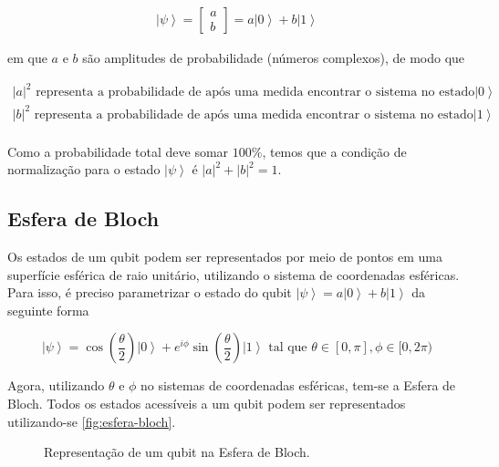 \[\begin{aligned}
\left | \psi \right \rangle = \begin{bmatrix} a \\ b \end{bmatrix} = a \left| 0 \right \rangle + b \left| 1 \right \rangle
\end{aligned}\]

em que \(a\) e \(b\) são {amplitudes de probabilidade} (números
complexos), de modo que

\begin{gather*}
    |a|^2 \text{ representa a probabilidade de após uma medida encontrar o sistema no estado}
\left| 0 \right\rangle\\
    |b|^2 \text{ representa a probabilidade de após uma medida encontrar o sistema no estado}
\left| 1 \right\rangle\\
\end{gather*}

Como a probabilidade total deve somar \(100\%\), temos que a {condição
de normalização} para o estado \(\left| \psi \right\rangle\) é
\(|a|^2 + |b|^2 = 1\).

\subsection{Esfera de Bloch}\label{subsec:esfera-de-bloch}

Os estados de um qubit podem ser representados por meio de pontos em uma
superfície esférica de raio unitário, utilizando o sistema de
coordenadas esféricas.
Para isso, é preciso parametrizar o estado do qubit
\(\left| \psi \right\rangle = a \left| 0 \right\rangle + b \left| 1 \right\rangle\)
da seguinte forma

\[\left| \psi \right\rangle = \cos\left(  \dfrac{\theta}{2} \right) \left| 0 \right\rangle + e^{i\phi} \sin\left( \dfrac{\theta}{2} \right) \left| 1 \right\rangle \text{ tal que } \theta \in [0, \pi], \phi \in [0, 2\pi)\]

Agora, utilizando \(\theta\) e \(\phi\) no sistemas de coordenadas
esféricas, tem-se a Esfera de Bloch.
Todos os estados acessíveis a um qubit podem ser representados utilizando-se \autoref{fig:esfera-bloch}.

\begin{figure}[!htp]
    \centering
    
    \caption{Representação de um qubit na Esfera de Bloch.}
    \label{fig:esfera-bloch}
\end{figure}

